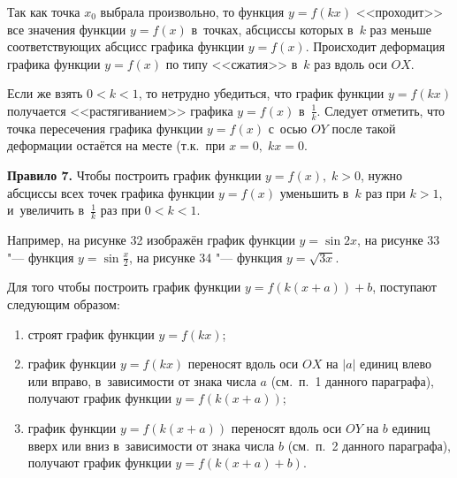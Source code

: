 Так как точка $x_{0}$ выбрала произвольно, то функция $y = f(kx)$
<<проходит>> все значения функции $y = f(x)$ в~точках, абсциссы которых
в~$k$ раз меньше соответствующих абсцисс графика функции $y = f(x)$.
Происходит деформация графика функции $y = f(x)$ по типу <<сжатия>>
в~$k$ раз вдоль оси $OX$.

Если же взять $0 < k < 1$, то нетрудно убедиться, что график функции
$y = f(kx)$ получается <<растягиванием>> графика
$y = f(x)$ в~$\displaystyle \frac{1}{k}$.
Следует отметить, что точка пересечения графика функции $y = f(x)$
с~осью $OY$ после такой деформации остаётся на месте
(т.к.\ при $x = 0, \; kx = 0$.

\textbf{Правило 7.} Чтобы построить график функции $y = f(x), \; k > 0$,
нужно абсциссы всех точек графика функции $y = f(x)$ уменьшить
в~$k$ раз при $k > 1$, и~увеличить в~$\displaystyle \frac{1}{k}$
раз при $0 < k < 1$.

\begin{figure}
\end{figure}

Например, на рисунке 32 изображён график функции $y = \sin 2x$,
на рисунке 33 "--- функция $\displaystyle y = \sin \frac{x}{2}$,
на рисунке 34 "--- функция $y = \sqrt{3x}$.

\begin{figure}
\end{figure}

\begin{figure}
\end{figure}

\begin{figure}
\end{figure}

Для того чтобы построить график функции $y = f(k(x + a)) + b$,
поступают следующим образом:
\begin{enumerate}
\item строят график функции $y = f(kx)$;
\item график функции $y = f(kx)$ переносят вдоль оси $OX$ на $|a|$ единиц
влево или вправо, в~зависимости от знака числа $a$
(см.\ п.~1 данного параграфа), получают график функции $y = f(k(x+a))$;
\item график функции $y = f(k(x+a))$ переносят вдоль оси $OY$ на $b$
единиц вверх или вниз в~зависимости от знака числа $b$
(см.\ п.~2 данного параграфа), получают график функции
$y = f(k(x+a) + b)$.
\end{enumerate}

